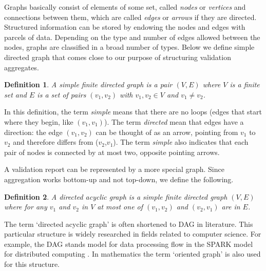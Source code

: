 \documentclass[a4paper, 11pt,titlepage]{article}
\newtheorem{definition}{Definition}
\begin{document}
Graphs basically consist of elements of some set, called \emph{nodes} or
\emph{vertices} and connections between them, which are called \emph{edges} or
\emph{arrows} if they are directed. Structured information can be stored by
endowing the nodes and edges with parcels of data.  Depending on the type and
number of edges allowed between the nodes, graphs are classified in a broad
number of types.  Below we define simple directed graph that comes close to our
purpose of structuring validation aggregates.
%
\begin{definition}
A \emph{simple finite directed graph} is a pair  $(V,E)$ where $V$ is a finite set and $E$
is a set of pairs $(v_1,v_2)$ with $v_1,v_2\in V$ and $v_1\not=v_2$.
\end{definition}
In this definition, the term \emph{simple} means that there are no loops (edges
that start where they begin, like $(v_1,v_1)$). The term \emph{directed} mean
that edges have a direction: the edge $(v_1,v_2)$ can be thought of as an
arrow, pointing from $v_1$ to $v_2$ and therefore differs from ($v_2$,$v_1$).
The term \emph{simple} also indicates that each pair of nodes is connected by
at most two, opposite pointing arrows.


A validation report can be represented by a more special graph. Since
aggregation works bottom-up and not top-down, we define the following.
\begin{definition}
A \emph{directed acyclic graph} is a simple finite directed graph $(V,E)$ where
for any $v_1$ and $v_2$ in $V$ at most one of $(v_1,v_2)$ and $(v_2,v_1)$ are
in $E$.
\end{definition}
%
The term `directed acyclic graph' is often shortened to DAG in literature. This
particular structure is widely researched in fields related to computer
science. For example, the DAG stands model for data processing flow in the
SPARK model for distributed computing \citep{gupta2003spark}. In mathematics
the term `oriented graph' is also used for this structure.
\end{document}
